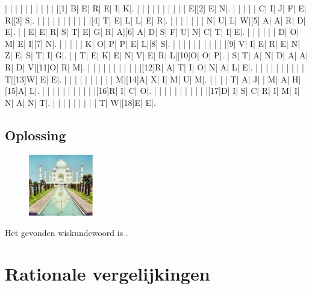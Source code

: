 \documentclass[12pt]{article}
\begin{document}
\begin{theorie}
\begin{Puzzle}{22}{18}
|{}  |{}  |{}  |{}  |{}  |{}  |{}  |{}  |{}  |{}  |[1] B|   E|   R|   E|   I|   K|.
|{}  |{}  |{}  |{}  |{}  |{}  |{}  |{}  |{}  |   E|[2] E|   N|.
|{}  |{}  |{}  |{}  |   C|   I|   J|   F|   E|   R|[3] S|.
|{}  |{}  |{}  |{}  |{}  |{}  |{}  |{}  |{}  |{}  |[4] T|   E|   L|   L|   E|   R|.
|{}  |{}  |{}  |{}  |{}  |{}  |   N|   U|   L|   W|[5] A|   A|   R|   D|   E|.
|{}  |   E|   E|   R|   S|   T|   E|   G|   R|   A|[6] A|   D|   S|   F|   U|   N|   C|   T|   I|   E|.
|{}  |{}  |{}  |{}  |{}  |   D|   O|   M|   E|   I|[7] N|.
|{}  |{}  |{}  |{}  |   K|   O|   P|   P|   E|   L|[8] S|.
|{}  |{}  |{}  |{}  |{}  |{}  |{}  |{}  |{}  |{}  |[9] V|   I|   E|   R|   E|   N|   Z|   E|   S|   T|   I|   G|.
|{}  |   T|   E|   K|   E|   N|   V|   E|   R|   L|[10]O|   O|   P|.
|   S|   T|   A|   N|   D|   A|   A|   R|   D|   V|[11]O|   R|   M|.
|{}  |{}  |{}  |{}  |{}  |{}  |{}  |{}  |{}  |{}  |[12]R|   A|   T|   I|   O|   N|   A|   L|   E|.
|{}  |{}  |{}  |{}  |{}  |{}  |{}  |{}  |{}  |   T|[13]W|   E|   E|.
|{}  |{}  |{}  |{}  |{}  |{}  |{}  |{}  |{}  |   M|[14]A|   X|   I|   M|   U|   M|.
|{}  |{}  |{}  |   T|   A|   J|{}  |   M|   A|   H|[15]A|   L|.
|{}  |{}  |{}  |{}  |{}  |{}  |{}  |{}  |{}  |{}  |[16]R|   I|   C|   O|.
|{}  |{}  |{}  |{}  |{}  |{}  |{}  |{}  |{}  |{}  |[17]D|   I|   S|   C|   R|   I|   M|   I|   N|   A|   N|   T|.
|{}  |{}  |{}  |{}  |{}  |{}  |{}  |{}  |   T|   W|[18]E|   E|.
\end{Puzzle}

\subsection*{Oplossing}
\begin{figure}
  \vspace*{-2cm}
  \includegraphics[width=0.25\textwidth]{taj-mahal}
\end{figure}
Het gevonden wiskundewoord is \arule{5cm}.

\pagebreak

\end{theorie}

\section{Rationale vergelijkingen}
\end{document}

